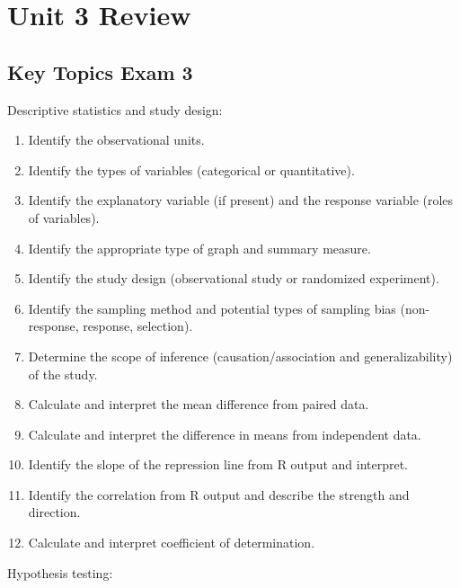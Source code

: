 \documentclass[
]{report}
\begin{document}
\section{Unit 3 Review}\label{unit-3-review-1}

\subsection{Key Topics Exam 3}\label{key-topics-exam-3}

Descriptive statistics and study design:

\begin{enumerate}
\def\labelenumi{\arabic{enumi}.}
\item
  Identify the observational units.
\item
  Identify the types of variables (categorical or quantitative).
\item
  Identify the explanatory variable (if present) and the response variable (roles of variables).
\item
  Identify the appropriate type of graph and summary measure.
\item
  Identify the study design (observational study or randomized experiment).
\item
  Identify the sampling method and potential types of sampling bias (non-response, response, selection).
\item
  Determine the scope of inference (causation/association and generalizability) of the study.
\item
  Calculate and interpret the mean difference from paired data.
\item
  Calculate and interpret the difference in means from independent data.
\item
  Identify the slope of the repression line from R output and interpret.
\item
  Identify the correlation from R output and describe the strength and direction.
\item
  Calculate and interpret coefficient of determination.
\end{enumerate}

Hypothesis testing:
\end{document}
